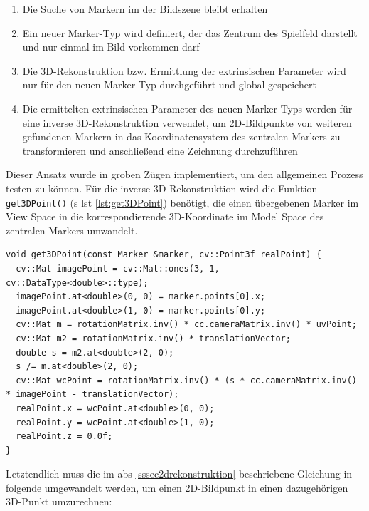 \begin{enumerate}
\item Die Suche von Markern im der Bildszene bleibt erhalten
\item Ein neuer Marker-Typ wird definiert, der das Zentrum des Spielfeld darstellt und nur einmal im Bild vorkommen darf
\item Die 3D-Rekonstruktion bzw. Ermittlung der extrinsischen Parameter wird nur für den neuen Marker-Typ durchgeführt und global gespeichert
\item Die ermittelten extrinsischen Parameter des neuen Marker-Typs werden für eine inverse 3D-Rekonstruktion verwendet, um 2D-Bildpunkte von weiteren gefundenen Markern in das Koordinatensystem des zentralen Markers zu transformieren und anschließend eine Zeichnung durchzuführen
\end{enumerate}

\noindent Dieser Ansatz wurde in groben Zügen implementiert, um den allgemeinen Prozess testen zu können. Für die inverse 3D-Rekonstruktion wird die Funktion \texttt{get3DPoint()} (\acs{s} \acs{lst} \ref{lst:get3DPoint}) benötigt, die einen übergebenen Marker im View Space in die korrespondierende 3D-Koordinate im Model Space des zentralen Markers umwandelt. 

\begin{lstlisting}[caption={Die Funktion \texttt{get3DPoint();}, die einen übergebenen Marker im View Space mittels einer inversen Transformation in den Model Space des zentralen Markers transformiert und nicht Bestandteil des Projektquellcodes ist}, label={lst:get3DPoint}]
void get3DPoint(const Marker &marker, cv::Point3f realPoint) {
  cv::Mat imagePoint = cv::Mat::ones(3, 1, cv::DataType<double>::type);
  imagePoint.at<double>(0, 0) = marker.points[0].x;
  imagePoint.at<double>(1, 0) = marker.points[0].y;
  cv::Mat m = rotationMatrix.inv() * cc.cameraMatrix.inv() * uvPoint;
  cv::Mat m2 = rotationMatrix.inv() * translationVector;
  double s = m2.at<double>(2, 0);
  s /= m.at<double>(2, 0);
  cv::Mat wcPoint = rotationMatrix.inv() * (s * cc.cameraMatrix.inv() * imagePoint - translationVector);
  realPoint.x = wcPoint.at<double>(0, 0);
  realPoint.y = wcPoint.at<double>(1, 0);
  realPoint.z = 0.0f;
}
\end{lstlisting}

\noindent Letztendlich muss die im \acs{abs} \ref{sssec2drekonstruktion} beschriebene Gleichung in folgende umgewandelt werden, um einen 2D-Bildpunkt in einen dazugehörigen 3D-Punkt umzurechnen:


